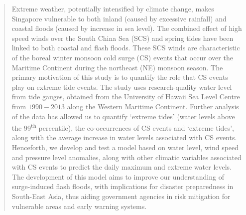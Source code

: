 \documentclass[12pt]{article}
\title{}
\author{}
\date{}
\begin{document}
\fancyhead{} %

\maketitle
\tableofcontents
\newpage
\doublespacing

\begin{abstract}
    Extreme weather, potentially intensified by climate change, makes Singapore vulnerable to both inland (caused by excessive rainfall) and coastal floods
    (caused by increase in sea level). The combined effect of high speed winds over the South China Sea (SCS) and spring tides have been linked to 
    both coastal and flash floods. These SCS winds are characteristic of the boreal winter monsoon cold surge (CS) events that 
    occur over the Maritime Continent during the northeast (NE) monsoon season. The primary motivation of this study is to quantify the role that CS events
    play on extreme tide events. The study uses research-quality water level from tide gauges, obtained from
    the University of Hawaii Sea Level Centre from $1990-2013$ along the 
    Western Maritime Continent. Further analysis of the data has allowed us to quantify `extreme tides' (water levels above the 99\textsuperscript{th} percentile), 
    the co-occurrences of CS events and `extreme tides', along with the
    average increase in water levels associated with CS events. Henceforth, we develop and test a model based on
    water level, wind speed and pressure level anomalies, along with other climatic variables associated with CS events to predict the daily maximum and extreme water levels. 
    The development of this model aims to improve our understanding of surge-induced flash floods, with implications for disaster preparedness in South-East Asia, thus aiding
    government agencies in risk mitigation for vulnerable areas and early warning systems.
\end{abstract}
\end{document}
